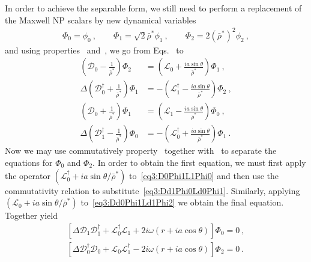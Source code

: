In order to achieve the separable form, we still need to perform a replacement of the Maxwell NP scalars by new dynamical variables
\begin{align}
    \label{eq3:phiBarRhoToPhi}
    \Phi_0 = \phi_0 ~,\qquad \Phi_1 = \sqrt{2} \bar{\rho}^* \phi_1 ~,\qquad \Phi_2 = 2 (\bar{\rho}^*)^2 \phi_2  ~,
\end{align}
and using properties~ and~, we go from Eqs.~ to
\begin{subequations}
    \label{eq3:AllDPhiLPhi}
    \begin{align}
        \label{eq3:D0Phi2L0Phi1}
        \left( \mathscr{D}_0 - \frac{1}{\bar{\rho}^*} \right) \Phi_2 &=
        \left( \mathscr{L}_0 + \frac{i a \sin\theta}{\bar{\rho}^*} \right) \Phi_1 ~, \\
        \label{eq3:Dd0Phi1Ld1Phi2}
        \Delta \left( \mathscr{D}^\dagger_0 + \frac{1}{\bar{\rho}^*} \right) \Phi_1 &= 
        -\left( \mathscr{L}^\dagger_1 - \frac{i a \sin\theta}{\bar{\rho}^*} \right) \Phi_2 ~, \\
        \label{eq3:D0Phi1L1Phi0}
        \left( \mathscr{D}_0 + \frac{1}{\bar{\rho}^*} \right) \Phi_1 &= 
        \left( \mathscr{L}_1 - \frac{i a \sin\theta}{\bar{\rho}^*} \right) \Phi_0 ~, \\
        \label{eq3:Dd1Phi0Ld0Phi1}
        \Delta \left( \mathscr{D}^\dagger_1 - \frac{1}{\bar{\rho}^*} \right) \Phi_0 &= 
        -\left( \mathscr{L}^\dagger_0 + \frac{i a \sin\theta}{\bar{\rho}^*} \right) \Phi_1 ~.
    \end{align}
\end{subequations}
Now we may use commutatively property~ together with~ to separate the equations for $\Phi_0$ and $\Phi_2$.
In order to obtain the first equation, we must first apply the operator $(\mathscr{L}^\dagger_0 + i a \sin\theta/\bar{\rho}^*)$ to~\eqref{eq3:D0Phi1L1Phi0} and then use the commutativity relation to substitute~\eqref{eq3:Dd1Phi0Ld0Phi1}.
Similarly, applying $(\mathscr{L}_0 + i a \sin\theta/\bar{\rho}^*)$ to~\eqref{eq3:Dd0Phi1Ld1Phi2} we obtain the final equation.
Together yield
\begin{align}
    \label{eq3:DDLLPhi0}
    \left[ \Delta \mathscr{D}_1 \mathscr{D}^\dagger_1 + \mathscr{L}^\dagger_0 \mathscr{L}_1 + 2 i \omega (r+i a \cos\theta) \right] \Phi_0 = 0 ~, \\
    \label{eq3:DDLLPhi2}
    \left[ \Delta \mathscr{D}^\dagger_0 \mathscr{D}_0 + \mathscr{L}_0 \mathscr{L}^\dagger_1 - 2 i \omega (r+i a \cos\theta) \right] \Phi_2 = 0 ~.
\end{align}

